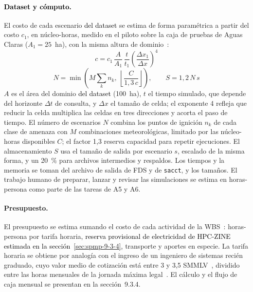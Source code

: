 \paragraph{\textcolor{black}{Dataset y cómputo.}} El costo de cada escenario \textcolor{black}{del dataset} se estima de forma paramétrica a partir del costo $c_1$, en núcleo-horas, medido en el piloto sobre la caja de pruebas de Aguas Claras ($A_1 = 25$~ha), con la misma altura de dominio~\cite{pmi2017pmbok}:
\[ c = c_1\,\frac{A}{A_1}\,\frac{t}{t_1}\left(\frac{\Delta x_1}{\Delta x}\right)^{4} \]
\[ N = \min\left(M\sum_k n_k,\ \left\lfloor\frac{C}{1{,}3\,c}\right\rfloor\right),\qquad S = 1{,}2\,N\,s \]
$A$ es el área del dominio \textcolor{black}{del dataset} (100~ha), $t$ el tiempo simulado, que depende del horizonte $\Delta t$ de consulta, y $\Delta x$ el tamaño de celda; el exponente 4 refleja que reducir la celda multiplica las celdas en tres direcciones y acorta el paso de tiempo. El número de escenarios $N$ combina los puntos de ignición $n_k$ de cada clase de amenaza con $M$ combinaciones meteorológicas, limitado por las núcleo-horas disponibles $C$; el factor 1,3 reserva capacidad para repetir ejecuciones. El almacenamiento $S$ usa el tamaño de salida por escenario $s$, escalado de la misma forma, y un 20~\% para archivos intermedios y respaldos. Los tiempos y la memoria se toman del archivo de salida de FDS y de \texttt{sacct}, y los tamaños. El trabajo humano de preparar, lanzar y revisar las simulaciones se estima en horas-persona como parte de las tareas de A5 y A6.

\paragraph{Presupuesto.} El presupuesto se estima sumando el costo de cada actividad de la WBS~\cite{pmi2017pmbok}: horas-persona por tarifa horaria, \textcolor{black}{reserva provisional de electricidad de HPC-ZINE estimada en la sección~\ref{sec:spmp-9-3-4}}, transporte y aportes en especie. La tarifa horaria se obtiene por analogía con el ingreso de un ingeniero de sistemas recién graduado, cuyo valor medio de cotización está entre 3 y 3,5 SMMLV~\cite{ole2022}, dividido entre las horas mensuales de la jornada máxima legal~\cite{ley2101}. El cálculo y el flujo de caja mensual se presentan en la sección~9.3.4.
